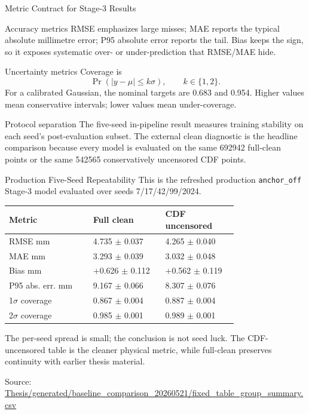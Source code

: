 \documentclass[UTF8,aspectratio=169]{ctexbeamer}
\newcommand{\src}[1]{\vfill{\tiny\textcolor{gray!75!black}{Source: \url{#1}}}}
\begin{document}
\begin{frame}{Metric Contract for Stage-3 Results}
\small
\begin{block}{Accuracy metrics}
\footnotesize
RMSE emphasizes large misses; MAE reports the typical absolute millimetre error;
P95 absolute error reports the tail. Bias keeps the sign, so it exposes systematic
over- or under-prediction that RMSE/MAE hide.
\end{block}

\begin{block}{Uncertainty metrics}
\footnotesize
Coverage is
\[
\Pr(|y-\mu|\leq k\sigma),\qquad k\in\{1,2\}.
\]
For a calibrated Gaussian, the nominal targets are 0.683 and 0.954. Higher values
mean conservative intervals; lower values mean under-coverage.
\end{block}

\begin{block}{Protocol separation}
\footnotesize
The five-seed in-pipeline result measures training stability on each seed's
post-evaluation subset. The external clean diagnostic is the headline comparison
because every model is evaluated on the same \num{692942} full-clean points or
the same \num{542565} conservatively uncensored CDF points.
\end{block}
\end{frame}

\begin{frame}{Production Five-Seed Repeatability}
\small
This is the refreshed production \texttt{anchor\_off} Stage-3 model evaluated
over seeds 7/17/42/99/2024.

\vspace{0.35em}
\begin{center}
\begin{tabular}{L{0.28\linewidth}R{0.24\linewidth}R{0.24\linewidth}}
\toprule
Metric & Full clean & CDF uncensored \\
\midrule
RMSE mm & 4.735 \(\pm\) 0.037 & 4.265 \(\pm\) 0.040 \\
MAE mm & 3.293 \(\pm\) 0.039 & 3.032 \(\pm\) 0.048 \\
Bias mm & +0.626 \(\pm\) 0.112 & +0.562 \(\pm\) 0.119 \\
P95 abs. err. mm & 9.167 \(\pm\) 0.066 & 8.307 \(\pm\) 0.076 \\
1\(\sigma\) coverage & 0.867 \(\pm\) 0.004 & 0.887 \(\pm\) 0.004 \\
2\(\sigma\) coverage & 0.985 \(\pm\) 0.001 & 0.989 \(\pm\) 0.001 \\
\bottomrule
\end{tabular}
\end{center}

\vspace{0.3em}
\footnotesize
The per-seed spread is small; the conclusion is not seed luck. The CDF-uncensored
table is the cleaner physical metric, while full-clean preserves continuity with
earlier thesis material.

\src{Thesis/generated/baseline_comparison_20260521/fixed_table_group_summary.csv}
\end{frame}
\end{document}
